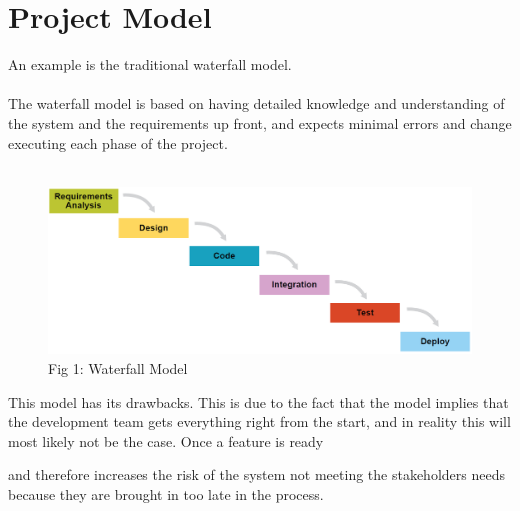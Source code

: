 \section{Project Model}



An example is the traditional waterfall model.
\\\\
The waterfall model is based on having detailed knowledge and understanding of the system and the requirements up front, and expects minimal errors and change executing each phase of the project.
\\\\
\begin{figure}
 \includegraphics{VAPIQ-PICTURES/WaterFall.PNG}
 \caption{Fig 1: Waterfall Model}
\end{figure}


This model has its drawbacks. This is due to the fact that the model implies that the development team gets everything right from the start, and in reality this will most likely not be the case. Once a feature is ready

and therefore increases the risk of the system not meeting the stakeholders needs because they are brought in too late in the process.









